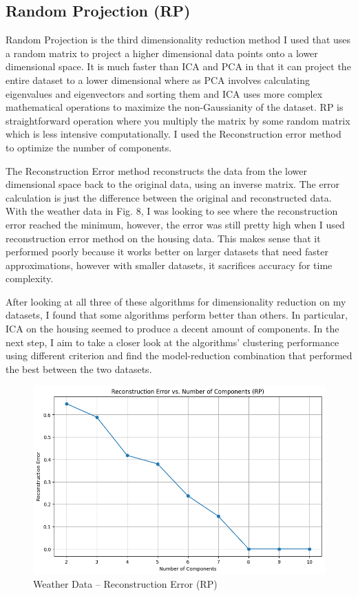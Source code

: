 \documentclass[conference]{IEEEtran}
\begin{document}
\subsection{Random Projection (RP)} 
\par Random Projection is the third dimensionality reduction method I used that uses a random matrix to project a higher dimensional data points onto a lower dimensional space. It is much faster than ICA and PCA in that it can project the entire dataset to a lower dimensional where as PCA involves calculating eigenvalues and eigenvectors and sorting them and ICA uses more complex mathematical operations to maximize the non-Gaussianity of the dataset. RP is straightforward operation where you multiply the matrix by some random matrix which is less intensive computationally. I used the Reconstruction error method to optimize the number of components. 
\par The Reconstruction Error method reconstructs the data from the lower dimensional space back to the original data, using an inverse matrix. The error calculation is just the difference between the original and reconstructed data. With the weather data in Fig. 8, I was looking to see where the reconstruction error reached the minimum, however, the error was still pretty high when I used reconstruction error method on the housing data. This makes sense that it performed poorly because it works better on larger datasets that need faster approximations, however with smaller datasets, it sacrifices accuracy for time complexity.
\par After looking at all three of these algorithms for dimensionality reduction on my datasets, I found that some algorithms perform better than others. In particular, ICA on the housing seemed to produce a decent amount of components. In the next step, I aim to take a closer look at the algorithms' clustering performance using different criterion and find the model-reduction combination that performed the best between the two datasets.
\begin{figure}
    \centering
    \includegraphics[width=0.9\linewidth]{figures//weather_figures/step_2d.png}
    \caption{Weather Data -- Reconstruction Error (RP)}
    \label{fig:8_weather_reconstruction
}
\end{figure}
\end{document}

